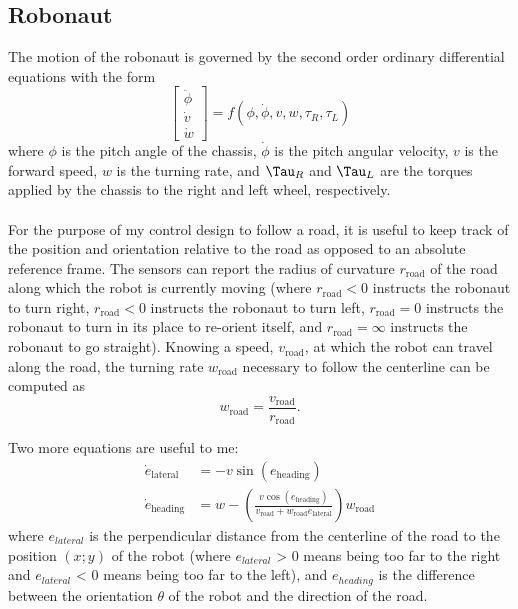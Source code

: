 \documentclass{article}
\begin{document}
\subsection{Robonaut}
The motion of the robonaut is governed by the second order ordinary differential equations with the form
\begin{equation}
\label{eqEOM}
\begin{bmatrix} \ddot{\phi} \\ \dot{v} \\ \dot{w} \end{bmatrix} = f(\phi,\dot{\phi},v,w,\tau_{R},\tau_{L})
\end{equation}
where $\phi$ is the pitch angle of the chassis, $\dot{\phi}$ is the pitch angular velocity, $v$ is the forward
speed, $w$ is the turning rate, and $\Tau_{R}$ and $\Tau_{L}$ are the torques applied by the chassis to the right
and left wheel, respectively.\\
\\
For the purpose of my control design to follow a road, it is useful to keep track of the position and orientation relative to the road as opposed to an absolute reference frame. The sensors can report the radius of curvature $r_\text{road}$ of the road along which the robot is currently moving (where $r_\text{road}<0$ instructs the robonaut to turn right, $r_\text{road}<0$ instructs the robonaut to turn left, $r_\text{road}=0$ instructs the robonaut to turn in its place to re-orient itself, and $r_\text{road}=\infty$ instructs the robonaut to go straight). Knowing a speed, $v_\text{road}$, at which the robot can travel along the road, the turning rate $w_\text{road}$ necessary to follow the centerline can be computed as
\begin{equation}
\label{eqncurv}
w_\text{road} = \frac{v_\text{road}}{r_\text{road}}.
\end{equation}

Two more equations are useful to me:
\begin{align}
\dot{e}_\text{lateral} &= -v\sin\left(e_\text{heading}\right) \label{eqnLat}\\
\dot{e}_\text{heading} &= w-\left(\frac{v\cos\left(e_\text{heading}\right)}{v_\text{road}+w_\text{road}e_\text{lateral}}\right)w_\text{road} \label{eqnHead}
\end{align}
where $e_{lateral}$ is the perpendicular distance from the centerline of the road to the
position $(x;y)$ of the robot (where $e_{lateral}$ > 0 means being too far to the right and $e_{lateral}$ < 0
means being too far to the left), and $e_{heading}$ is the difference between the orientation
$\theta$ of the robot and the direction of the road.\\
\end{document}
